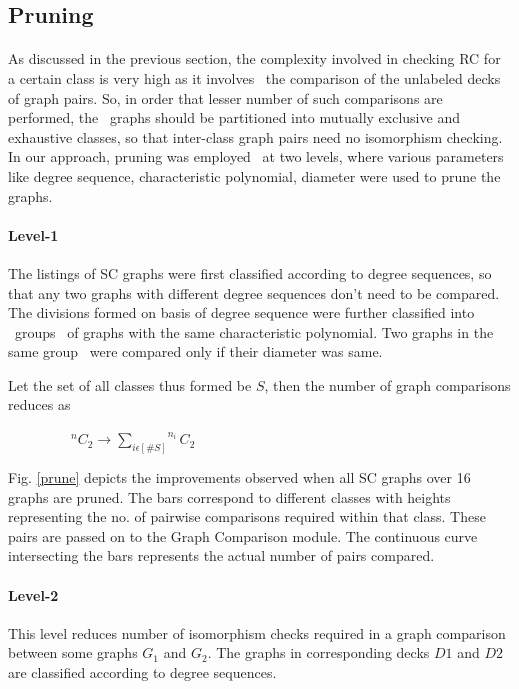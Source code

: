 \documentclass[12pt,conference]{IEEEtran}
\begin{document}
\subsection{\label{2.3} Pruning }
\paragraph*{} As discussed in the previous section, the complexity involved in checking RC for a certain class is very high as it involves  the comparison of the unlabeled decks of graph pairs. So, in order that lesser number of such comparisons are performed, the  graphs should be partitioned into mutually exclusive and exhaustive classes, so that inter-class graph pairs need no isomorphism checking. In our approach, pruning was employed  at two levels, where various parameters like degree sequence, characteristic polynomial, diameter were used to prune the graphs.  \\
\paragraph*{\label{2.3a} Level-1 } The listings of SC graphs were first classified according to degree sequences, so that any two graphs with different degree sequences don’t need to be compared. The divisions formed on basis of degree sequence were further classified into  groups  of graphs with the same characteristic polynomial. Two graphs in the same group   were compared only if their diameter was same. 

 Let the set of all classes thus formed be $S$, then the number of graph comparisons reduces as

\ \ \ \ \ \ \ \ \  $ ^{n}C_2 \rightarrow {\sum_{i \epsilon [\#S]}} ^{n_i}C_2 $

Fig. \ref{prune} depicts the improvements observed when all SC graphs over 16 graphs are pruned. The bars correspond to different classes with heights representing the no. of pairwise comparisons required within that class.
These pairs are passed on to the Graph Comparison module. The continuous curve intersecting the bars represents the actual number of pairs compared. \\ 

\paragraph*{\label{2.3b} Level-2} This level reduces number of isomorphism checks required in a graph comparison between some graphs $G_1$ and $G_2$. The graphs in corresponding decks $D1$ and $D2$ are classified according to degree sequences. 
\end{document}
